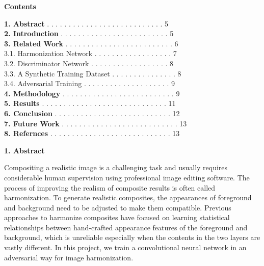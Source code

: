 \documentclass{article}
\begin{document}
\newpage

\begin{flushleft}
\textbf{\Large Contents}
\end{flushleft}

\begin{center}
\end{center}

\begin{flushleft}
\textbf{1. Abstract} . . . . . . . . . . . . . . . . . . . . . . . . . . . 5\\
\textbf{2. Introduction} . . . . . . . . . . . . . . . . . . . . . . . . . 5\\
\textbf{3. Related Work} . . . . . . . . . . . . . . . . . . . . . . . . . 6\\
3.1. Harmonization Network . . . . . . . . . . . . . . . . . . 7\\
3.2. Discriminator Network . . . . . . . . . . . . . . . . . . 8\\
3.3. A Synthetic Training Dataset . . . . . . . . . . . . . . . 8\\
3.4. Adversarial Training . . . . . . . . . . . . . . . . . . . . 9\\
\textbf{4. Methodology} . . . . . . . . . . . . . . . . . . . . . . . . . . 9\\
\textbf{5. Results} . . . . . . . . . . . . . . . . . . . . . . . . . . . . . 11\\
\textbf{6. Conclusion} . . . . . . . . . . . . . . . . . . . . . . . . . . . 12\\
\textbf{7. Future Work} . . . . . . . . . . . . . . . . . . . . . . . . . . . 13\\
\textbf{8. Refernces} . . . . . . . . . . . . . . . . . . . . . . . . . . . . 13\\
\end{flushleft}


\newpage


\begin{flushleft}
\textbf{\large 1. Abstract}
\end{flushleft}

Compositing a realistic image is a challenging task and usually requires considerable human supervision using professional image editing software. The process of improving the realism of composite results is often called harmonization. To generate realistic composites, the appearances of foreground and background need to be adjusted to make them compatible. Previous approaches to harmonize composites have focused on learning statistical relationships between hand-crafted appearance features of the foreground and background, which is unreliable especially when the contents in the two layers are vastly different. In this project, we train a convolutional neural network in an adversarial way for image harmonization.\\\\
\end{document}
